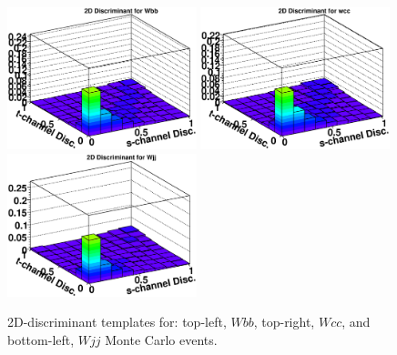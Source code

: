 \begin{figure}[!h!tbp]
\includegraphics[width=0.49\textwidth]
{eps/MatrixElement/performance/2D-Discriminant_wbb}
\includegraphics[width=0.49\textwidth]
{eps/MatrixElement/performance/2D-Discriminant_wcc}
\includegraphics[width=0.49\textwidth]
{eps/MatrixElement/performance/2D-Discriminant_wjj}
\vspace{-0.1in}
\caption{2D-discriminant templates for: top-left,
$Wbb$, top-right, $Wcc$, and bottom-left, $Wjj$ Monte Carlo events.}
\label{wbbwccwjj}
\end{figure}

